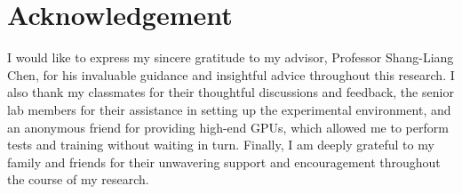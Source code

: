 
\fontsize{12}{18}\selectfont



\vspace{0.65\baselineskip}
\begingroup
\let\cleardoublepage\relax
\chapter*{Acknowledgement}
\endgroup

I would like to express my sincere gratitude to my advisor, Professor Shang-Liang Chen, for his invaluable guidance and insightful advice throughout this research. I also thank my classmates for their thoughtful discussions and feedback, the senior lab members for their assistance in setting up the experimental environment, and an anonymous friend for providing high-end GPUs, which allowed me to perform tests and training without waiting in turn. Finally, I am deeply grateful to my family and friends for their unwavering support and encouragement throughout the course of my research.
